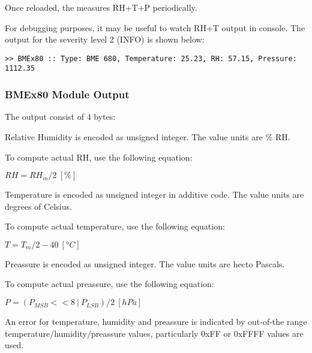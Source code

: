   Once reloaded, the  measures RH+T+P periodically. 
  
  For debugging purposes, it may be useful to watch RH+T output in console. The output for the severity level 2 (INFO) is shown below:

\begin{docCodeExample}
\begin{verbatim}
>> BMEx80 :: Type: BME 680, Temperature: 25.23, RH: 57.15, Pressure: 1112.35
\end{verbatim}
\end{docCodeExample}

\subsubsection{BMEx80 Module Output}
  The  output consist of 4 bytes:
  

  Relative Humidity is encoded as unsigned integer. The value units are \% RH.
  
  To compute actual RH, use the following equation:
  
  $RH = RH_m / 2 ~[\%]$

  Temperature is encoded as unsigned integer in additive code. The value units are degrees of Celsius.
  
  To compute actual temperature, use the following equation:
  
  $T = T_m / 2 - 40 ~[°C]$
  
  Preassure is encoded as unsigned integer. The value units are hecto Pascals.
  
  To compute actual preassure, use the following equation:
  
  $P = (P_{MSB} << 8 ~|~ P_{LSB}) / 2 ~[hPa]$
  
  
  An error for temperature, humidity and preassure is indicated by out-of-the range temperature/humidity/preassure values, particularly 0xFF or 0xFFFF values are used.
  

